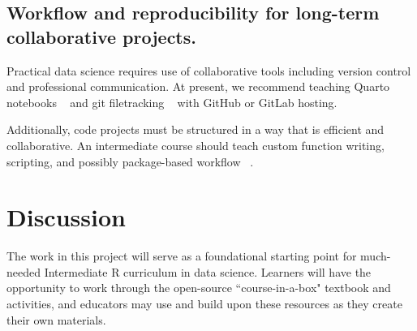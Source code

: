 \documentclass[10pt]{article}
\begin{document}
\subsection{Workflow and reproducibility for long-term collaborative projects.}

Practical data science requires use of collaborative tools including version control and professional communication.  At present, we recommend teaching Quarto notebooks ~\cite{quarto} and git filetracking ~\cite{git} with GitHub or GitLab hosting.

Additionally, code projects must be structured in a way that is efficient and collaborative.  An intermediate course should teach custom function writing, scripting, and possibly package-based workflow ~\cite{wickham2023rp}.





\section{Discussion}

The work in this project will serve as a foundational starting point for much-needed Intermediate R curriculum in data science.  Learners will have the opportunity to work through the open-source ``course-in-a-box" textbook and activities, and educators may use and build upon these resources as they create their own materials.



\end{document}
